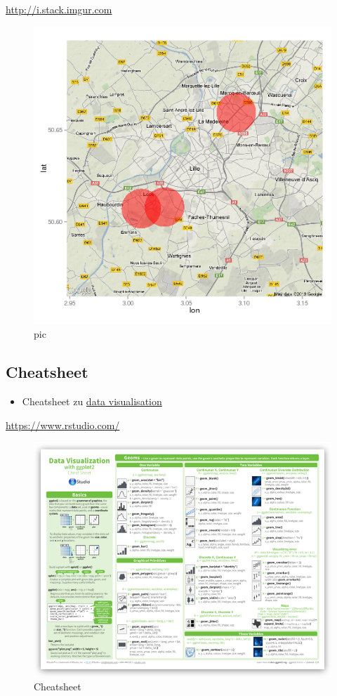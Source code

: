 \documentclass[]{article}
\providecommand{\tightlist}{%
  \setlength{\itemsep}{0pt}\setlength{\parskip}{0pt}}
\begin{document}
\url{http://i.stack.imgur.com}

\begin{figure}[htbp]
\centering
\includegraphics{figure/q3euq.png}
\caption{pic}
\end{figure}

\subsection{Cheatsheet}\label{cheatsheet}

\begin{itemize}
\tightlist
\item
  Cheatsheet zu
  \href{https://www.rstudio.com/wp-content/uploads/2015/04/ggplot2-cheatsheet.pdf}{data
  visualisation}
\end{itemize}

\url{https://www.rstudio.com/}

\begin{figure}[htbp]
\centering
\includegraphics{figure/ggplot2-cheatsheet.png}
\caption{Cheatsheet}
\end{figure}
\end{document}
